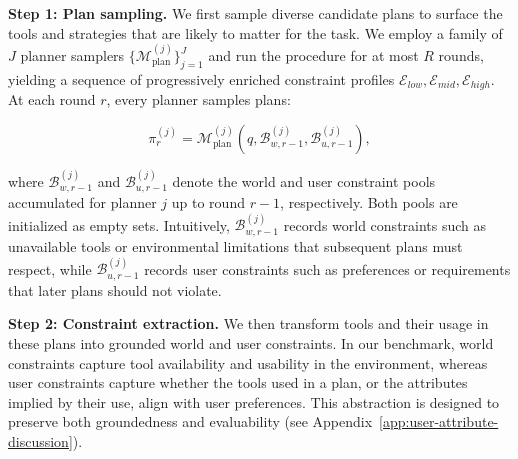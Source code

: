 \documentclass{llmxive}
\begin{document}
\noindent\textbf{Step 1: Plan sampling.}
We first sample diverse candidate plans to surface the tools and strategies that are likely to matter for the task.
We employ a family of $J$ planner samplers {\small $\{\mathcal{M}^{(j)}_{\mathrm{plan}}\}_{j=1}^{J}$} and run the procedure for at most $R$ rounds, yielding a sequence of progressively enriched constraint profiles $\mathcal{E}_{low}, \mathcal{E}_{mid}, \mathcal{E}_{high}$. At each round $r$, every planner samples plans:
\begin{footnotesize}
\begin{equation}
\pi^{(j)}_{r} = \mathcal{M}^{(j)}_{\mathrm{plan}}\!\left(q,\mathcal{B}^{(j)}_{w,r-1},\mathcal{B}^{(j)}_{u,r-1}\right),
\end{equation}
\end{footnotesize}
where {\small $\mathcal{B}^{(j)}_{w,r-1}$} and {\small $\mathcal{B}^{(j)}_{u,r-1}$} denote the world and user constraint pools accumulated for planner $j$ up to round $r-1$, respectively. Both pools are initialized as empty sets. Intuitively, {\small $\mathcal{B}^{(j)}_{w,r-1}$} records world constraints such as unavailable tools or environmental limitations that subsequent plans must respect, while {\small $\mathcal{B}^{(j)}_{u,r-1}$} records user constraints such as preferences or requirements that later plans should not violate.

\noindent\textbf{Step 2: Constraint extraction.}
We then transform tools and their usage in these plans into grounded world and user constraints.
In our benchmark, world constraints capture tool availability and usability in the environment, whereas user constraints capture whether the tools used in a plan, or the attributes implied by their use, align with user preferences. This abstraction is designed to preserve both groundedness and evaluability (see Appendix~\ref{app:user-attribute-discussion}).
\end{document}
